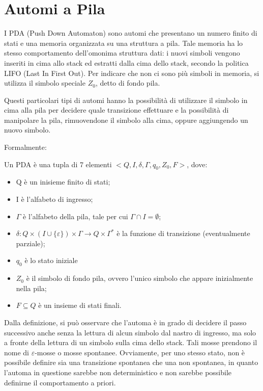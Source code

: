   \section{Automi a Pila}
  I PDA (Push Down Automaton) sono automi che presentano un numero finito di stati  e una memoria organizzata su una struttura a pila. Tale memoria ha lo stesso comportamento dell'omonima struttura dati: i nuovi simboli vengono inseriti in cima allo stack ed estratti dalla cima dello stack, secondo la politica LIFO (Last In First Out). Per indicare che non ci sono più simboli in memoria, si utilizza il simbolo speciale \(Z_0\), detto di fondo pila.

  Questi particolari tipi di automi hanno la possibilità di utilizzare il simbolo in cima alla pila per decidere quale transizione effettuare e la possibilità di manipolare la pila, rimuovendone il simbolo alla cima, oppure aggiungendo un nuovo simbolo.

  \vspace{1in}

  \noindent
  Formalmente:
  \begin{definition}
    Un PDA è una tupla di 7 elementi \(<Q, I, \delta, \Gamma, q_0, Z_0, F>\), dove:
    \begin{itemize}
      \item Q è un inisieme finito di stati;
      \item I è l'alfabeto di ingresso;
      \item \(\Gamma\) è l'alfabeto della pila, tale per cui \(\Gamma \cap I = \emptyset\);
      \item \(\delta:Q\times (I\cup \{\varepsilon\})\times \Gamma \to Q \times \Gamma^*\) è la funzione di transizione (eventualmente parziale);
      \item \(q_0\) è lo stato iniziale
      \item \(Z_0\) è il simbolo di fondo pila, ovvero l'unico simbolo che appare inizialmente nella pila;
      \item \(F\subseteq Q\) è un insieme di stati finali.
    \end{itemize}
  \end{definition}

  Dalla definizione, si può osservare che l'automa è in grado di decidere il passo successivo anche senza la lettura di alcun simbolo dal nastro di ingresso, ma solo a fronte della lettura di un simbolo sulla cima dello stack. Tali mosse prendono il nome di \(\varepsilon\)-mosse o mosse spontanee. Ovviamente, per uno stesso stato, non è possibile definire sia una transizione spontanea che una non spontanea, in quanto l'automa in questione sarebbe non deterministico e non sarebbe possibile definirne il comportamento a priori. 

